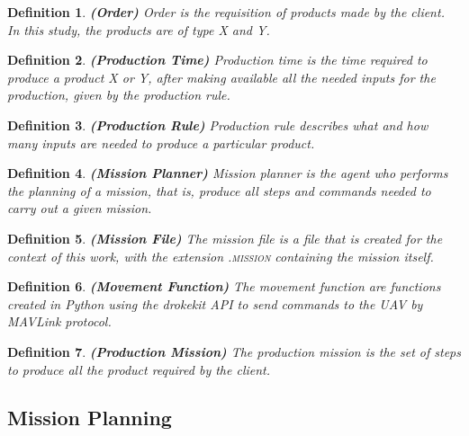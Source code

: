 \documentclass[conference]{IEEEtran}
\newtheorem{myDefinition}{Definition}
\begin{document}
\begin{myDefinition} 
\textbf{(Order)}
Order is the requisition of products made by the client. In this study, the products are of type X and Y.
\label{def:pedido}
\end{myDefinition}

\begin{myDefinition}
\textbf{(Production Time)}
Production time is the time required to produce a product X or Y, after making available all the needed inputs for the production, given by the production rule.
\label{def:tempoProducao}
\end{myDefinition}

\begin{myDefinition}
 \textbf{(Production Rule)}
Production rule describes what and how many inputs are needed to produce a particular product.
\label{def:regraProducao}
\end{myDefinition}

\begin{myDefinition}
\textbf{(Mission Planner)}
Mission planner is the agent who performs the planning of a mission, that is, produce all steps and commands needed to carry out a given mission.
\label{def:planejadorMissao}
\end{myDefinition}

\begin{myDefinition}
 \textbf{(Mission File)}
The mission file is a file that is created for the context of this work, with the extension \textsc{.mission} containing the mission itself.
\label{def:arquivoMissao}
\end{myDefinition}

\begin{myDefinition}
 \textbf{(Movement Function)}
The movement function are functions created in Python using the drokekit API to send commands to the UAV by MAVLink protocol.
\label{def:movFunc}
\end{myDefinition}

\begin{myDefinition}
 \textbf{(Production Mission)}
The production mission is the set of steps to produce all the product required by the client.
\label{def:prodMission}
\end{myDefinition}


\subsection{Mission Planning}
\label{subsec:missionplanning}
\end{document}
